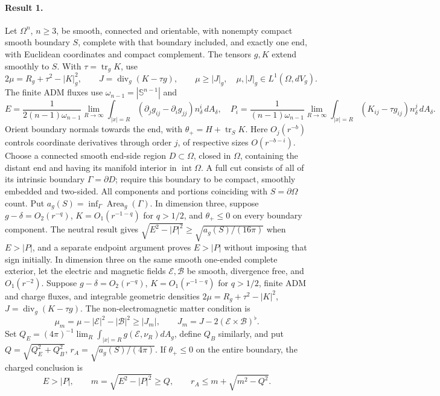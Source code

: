 \documentclass[11pt]{article}
\begin{document}
\paragraph{Result 1.} Let $\Omega^n$, $n\ge3$, be smooth, connected and orientable, with nonempty compact smooth boundary $S$, complete with that boundary included, and exactly one end, with Euclidean coordinates and compact complement. The tensors $g,K$ extend smoothly to $S$. With $\tau=\operatorname{tr}_gK$, use
\[
 2\mu=R_g+\tau^2-|K|_g^2,\qquad J=\operatorname{div}_g(K-\tau g),\qquad
 \mu\ge|J|_g,\quad\mu,|J|_g\in L^1(\Omega,dV_g).
\]
The finite ADM fluxes use $\omega_{n-1}=|\mathbb S^{n-1}|$ and
\[
 E=\frac1{2(n-1)\omega_{n-1}}\lim_{R\to\infty}\int_{|x|=R}
 (\partial_jg_{ij}-\partial_ig_{jj})n_\delta^i\,dA_\delta,\quad
 P_i=\frac1{(n-1)\omega_{n-1}}\lim_{R\to\infty}\int_{|x|=R}(K_{ij}-\tau g_{ij})n_\delta^j\,dA_\delta.
\]
Orient boundary normals towards the end, with $\theta_+=H+\operatorname{tr}_SK$. Here $O_j(r^{-b})$ controls coordinate derivatives through order $j$, of respective sizes $O(r^{-b-i})$. Choose a connected smooth end-side region $D\subset\Omega$, closed in $\Omega$, containing the distant end and having its manifold interior in $\operatorname{int}\Omega$. A full cut consists of all of its intrinsic boundary $\Gamma=\partial D$; require this boundary to be compact, smoothly embedded and two-sided. All components and portions coinciding with $S=\partial\Omega$ count. Put $a_g(S)=\inf_\Gamma\operatorname{Area}_g(\Gamma)$. In dimension three, suppose $g-\delta=O_2(r^{-q})$, $K=O_1(r^{-1-q})$ for $q>1/2$, and $\theta_+\le0$ on every boundary component. The neutral result gives $\sqrt{E^2-|P|^2}\ge\sqrt{a_g(S)/(16\pi)}$ when $E>|P|$, and a separate endpoint argument proves $E>|P|$ without imposing that sign initially. In dimension three on the same smooth one-ended complete exterior, let the electric and magnetic fields $\mathcal E,\mathcal B$ be smooth, divergence free, and $O_1(r^{-2})$. Suppose $g-\delta=O_2(r^{-q})$, $K=O_1(r^{-1-q})$ for $q>1/2$, finite ADM and charge fluxes, and integrable geometric densities $2\mu=R_g+\tau^2-|K|^2$, $J=\operatorname{div}_g(K-\tau g)$. The non-electromagnetic matter condition is
\[
 \mu_m=\mu-|\mathcal E|^2-|\mathcal B|^2\ge|J_m|,\qquad
 J_m=J-2(\mathcal E\times\mathcal B)^\flat.
\]
Set $Q_E=(4\pi)^{-1}\lim_R\int_{|x|=R}g(\mathcal E,\nu_R)dA_g$, define $Q_B$ similarly, and put $Q=\sqrt{Q_E^2+Q_B^2}$, $r_A=\sqrt{a_g(S)/(4\pi)}$. If $\theta_+\le0$ on the entire boundary, the charged conclusion is
\[
 E>|P|,\qquad m=\sqrt{E^2-|P|^2}\ge Q,\qquad
 r_A\le m+\sqrt{m^2-Q^2}.
\]
\end{document}
